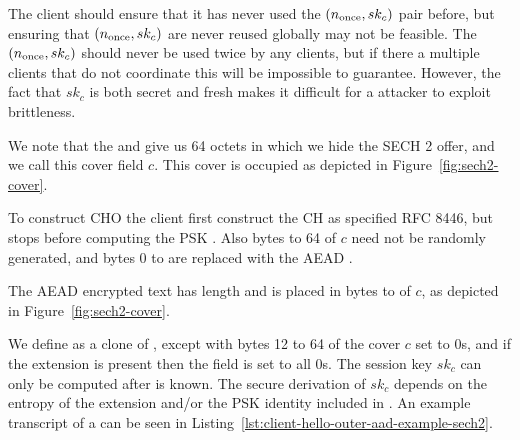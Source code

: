 The client should ensure that it has never used the $(\nonce,sk_c)$ pair before, but ensuring that $(\nonce,sk_c)$ are never reused globally may not be feasible.
The $(\nonce,sk_c)$ should never be used twice by any clients,
but if there a multiple clients that do not coordinate this will be impossible to guarantee.
However, the fact that $sk_c$ is both secret and fresh
makes it difficult for a attacker to exploit \nonce brittleness. %

We note that the  and \varlegacysessionid{} give us 64 octets in which we hide the \ac{SECH} 2 offer, and we call this cover field $c$.
This cover is occupied as depicted in Figure~\ref{fig:sech2-cover}.

To construct \ac{CHO} the client first construct the \ac{CH} as specified RFC 8446,
but stops before computing the \ac{PSK} .
Also bytes \sechtwocipheroffset{} to 64 of $c$ need not be randomly generated,
and bytes 0 to \sechtwocipheroffset{} are replaced with the \ac{AEAD} \nonce.

The \ac{AEAD} encrypted text has length \sechtwocipherlen{} and is placed in bytes \sechtwocipheroffset{}  to \sechtwocipherend{} of $c$, as depicted in Figure~\ref{fig:sech2-cover}.


We define  as a clone of , except with bytes 12 to 64 of the cover $c$ set to 0s, and if the  extension is present then the  field is set to all 0s.
The session key $sk_c$ can only be computed after  is known.
The secure derivation of $sk_c$ depends on the entropy of the  extension and/or the \ac{PSK} identity included in .
An example transcript of a  can be seen in Listing~\ref{lst:client-hello-outer-aad-example-sech2}.

